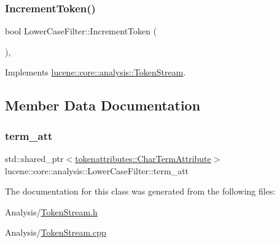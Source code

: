 \subsubsection{\texorpdfstring{Increment\+Token()}{IncrementToken()}}
{\footnotesize\ttfamily bool Lower\+Case\+Filter\+::\+Increment\+Token (\begin{DoxyParamCaption}{ }\end{DoxyParamCaption})\hspace{0.3cm}{\ttfamily [override]}, {\ttfamily [virtual]}}



Implements \mbox{\hyperlink{classlucene_1_1core_1_1analysis_1_1TokenStream_a614d4ea24a354d6f4354b4941b5124e2}{lucene\+::core\+::analysis\+::\+Token\+Stream}}.



\subsection{Member Data Documentation}
\mbox{\label{classlucene_1_1core_1_1analysis_1_1LowerCaseFilter_a0c5ad49e8254ea03353d3f02f3529b20}} 
\subsubsection{\texorpdfstring{term\+\_\+att}{term\_att}}
{\footnotesize\ttfamily std\+::shared\+\_\+ptr$<$\mbox{\hyperlink{classlucene_1_1core_1_1analysis_1_1tokenattributes_1_1CharTermAttribute}{tokenattributes\+::\+Char\+Term\+Attribute}}$>$ lucene\+::core\+::analysis\+::\+Lower\+Case\+Filter\+::term\+\_\+att\hspace{0.3cm}{\ttfamily [private]}}



The documentation for this class was generated from the following files\+:\begin{DoxyCompactItemize}
\item 
Analysis/\mbox{\hyperlink{TokenStream_8h}{Token\+Stream.\+h}}\item 
Analysis/\mbox{\hyperlink{TokenStream_8cpp}{Token\+Stream.\+cpp}}\end{DoxyCompactItemize}
